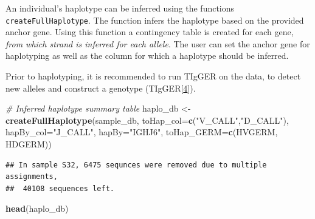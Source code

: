 \documentclass[11pt,]{article}
\newenvironment{Shaded}{}{}
\newcommand{\KeywordTok}[1]{\textcolor[rgb]{0.00,0.44,0.13}{\textbf{#1}}}
\newcommand{\DataTypeTok}[1]{\textcolor[rgb]{0.56,0.13,0.00}{#1}}
\newcommand{\StringTok}[1]{\textcolor[rgb]{0.25,0.44,0.63}{#1}}
\newcommand{\CommentTok}[1]{\textcolor[rgb]{0.38,0.63,0.69}{\textit{#1}}}
\newcommand{\NormalTok}[1]{#1}
\begin{document}
An individual's haplotype can be inferred using the functions
\texttt{createFullHaplotype}. The function infers the haplotype based on
the provided anchor gene. Using this function a contingency table is
created for each gene, \emph{from which strand is inferred for each
allele}. The user can set the anchor gene for haplotyping as well as the
column for which a haplotype should be inferred.

Prior to haplotyping, it is recommended to run TIgGER on the data, to
detect new alleles and construct a genotype
(TIgGER{[}\protect\hyperlink{ref-gadala2018identification}{4}{]}).

\begin{Shaded}
\begin{Highlighting}[]
\CommentTok{# Inferred haplotype summary table}
\NormalTok{haplo_db <-}\StringTok{ }\KeywordTok{createFullHaplotype}\NormalTok{(sample_db, }\DataTypeTok{toHap_col=}\KeywordTok{c}\NormalTok{(}\StringTok{"V_CALL"}\NormalTok{,}\StringTok{"D_CALL"}\NormalTok{),}
                                \DataTypeTok{hapBy_col=}\StringTok{"J_CALL"}\NormalTok{, }\DataTypeTok{hapBy=}\StringTok{"IGHJ6"}\NormalTok{, }
                                \DataTypeTok{toHap_GERM=}\KeywordTok{c}\NormalTok{(HVGERM, HDGERM))}
\end{Highlighting}
\end{Shaded}

\begin{verbatim}
## In sample S32, 6475 sequnces were removed due to multiple assignments,
##  40108 sequences left.
\end{verbatim}

\begin{Shaded}
\begin{Highlighting}[]
\KeywordTok{head}\NormalTok{(haplo_db)}
\end{Highlighting}
\end{Shaded}
\end{document}
